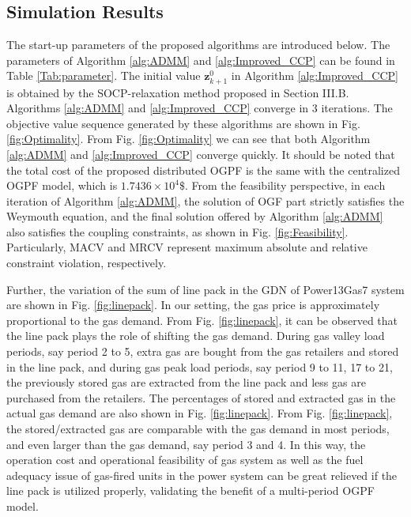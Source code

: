 \documentclass[journal]{IEEEtran}
\begin{document}
\subsection{Simulation Results}
The start-up parameters of the proposed algorithms are introduced below. The parameters of Algorithm \ref{alg:ADMM} and \ref{alg:Improved_CCP} can be found in Table \ref{Tab:parameter}. The initial value ${\boldsymbol{{z}}}^{0}_{k+1}$ in Algorithm \ref{alg:Improved_CCP} is obtained by the SOCP-relaxation method proposed in Section III.B. Algorithms \ref{alg:ADMM} and \ref{alg:Improved_CCP} converge in 3 iterations. The objective value sequence generated by  these  algorithms are shown in Fig. \ref{fig:Optimality}. From Fig. \ref{fig:Optimality} we can see that both Algorithm \ref{alg:ADMM} and \ref{alg:Improved_CCP} converge quickly. It should be noted that the total cost of the proposed distributed OGPF is the same with the centralized OGPF model, which is $1.7436\times 10^{4}\$$. From the feasibility perspective, in each iteration of Algorithm \ref{alg:ADMM}, the solution of OGF part strictly satisfies the Weymouth equation, and the final solution offered by Algorithm \ref{alg:ADMM} also satisfies the coupling constraints, as shown in Fig. \ref{fig:Feasibility}. Particularly, MACV and MRCV represent maximum absolute and relative constraint violation, respectively.

Further, the variation of the sum of line pack in the GDN of Power13Gas7 system are shown in Fig. \ref{fig:linepack}. In our setting, the gas price is approximately proportional to the gas demand. From Fig. \ref{fig:linepack}, it can be observed that the line pack plays the role of shifting the gas demand. During gas valley load periods, say period 2 to 5, extra gas are bought from the gas retailers and stored in the line pack, and during gas peak load periods, say period 9 to 11, 17 to 21, the previously stored gas are extracted from the line pack and less gas are purchased from the retailers. The percentages of stored and extracted gas in the actual gas demand are also shown in Fig. \ref{fig:linepack}. From Fig. \ref{fig:linepack}, the stored/extracted gas are comparable with the gas demand in most periods, and even larger than the gas demand, say period 3 and 4. In this way, the operation cost and operational feasibility of gas system as well as the fuel adequacy issue of gas-fired units in the power system can be great relieved if the line pack is utilized properly, validating the benefit of a multi-period OGPF model.
\end{document}
